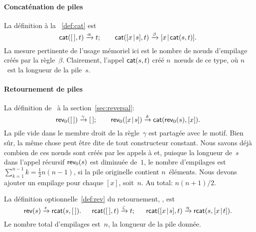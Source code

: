 \paragraph{Concaténation de piles}

La définition à la \fig~\vref{def:cat} est
\begin{equation*}
\textsf{cat}(        [\,],t) \xrightarrow{\smash{\alpha}} t;\qquad
\textsf{cat}([{x}\!\mid\!{s}],t) \xrightarrow{\smash{\beta}}
                                 [{x}\!\mid\!{\textsf{cat}(s,t)}].
\end{equation*}
La mesure pertinente de l'usage mémoriel ici est le nombre de
nœuds d'empilage créés par la
règle~\(\beta\). Clairement, l'appel \(\textsf{cat}(s,t)\) créé
\(n\)~nœuds de ce type, où \(n\)~est la longueur de la pile~\(s\).


\paragraph{Retournement de piles}

La définition de~ à la section~\ref{sec:reversal}:
\begin{equation*}
\textsf{rev}_0([\,]) \xrightarrow{\smash{\gamma}} [\,];\qquad
\textsf{rev}_0([{x}\!\mid\!{s}]) \xrightarrow{\smash{\delta}}
                         \textsf{cat}(\textsf{rev}_0(s),[x]).
\end{equation*}
La pile vide dans le membre droit de la règle~\(\gamma\) est partagée
avec le motif. Bien sûr, la même chose peut être dite de tout
constructeur constant. Nous savons déjà combien de ces nœuds sont
créés par les appels à  et, puisque la longueur de~\(s\)
dans l'appel récursif \(\textsf{rev}_0(s)\) est diminuée de~\(1\), le
nombre d'empilages est \(\sum_{k=1}^{n-1}k = \tfrac{1}{2}n(n-1)\), si
la pile originelle contient \(n\)~éléments. Nous devons ajouter un
empilage pour chaque \([x]\), soit~\(n\). Au total: \(n(n+1)/2\).

La définition optionnelle~\eqref{def:rev} du retournement,
, est
\begin{equation*}
\textsf{rev}(s) \xrightarrow{\smash{\epsilon}} \textsf{rcat}(s,[\,]).\quad\;\;
\textsf{rcat}([\,],t) \xrightarrow{\smash{\zeta}} t;\quad\;\;
\textsf{rcat}([{x}\!\mid\!{s}],t) \xrightarrow{\smash{\eta}}
                          \textsf{rcat}(s,[{x}\!\mid\!{t}]).
\end{equation*}
Le nombre total d'empilages est~\(n\), la longueur de la pile donnée.


